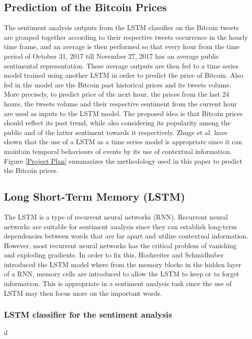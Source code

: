 \documentclass[conference]{IEEEtran}
\begin{document}
\subsection{Prediction of the Bitcoin Prices}
\par The sentiment analysis outputs from the LSTM classifier on the Bitcoin tweets are grouped together according to their respective tweets occurrence in the hourly time frame, and an average is then performed so that every hour from the time period of October 31, 2017 till November 27, 2017 has an average public sentimental representation. These average outputs are then fed to a time series model trained using another LSTM in order to predict the price of Bitcoin. Also fed in the model are the Bitcoin past historical prices and its tweets volume. More precisely, to predict price of the next hour, the prices from the last 24 hours, the tweets volume and their respective sentiment from the current hour are used as inputs to the LSTM model. The proposed idea is that Bitcoin prices should reflect its past trend, while also considering its popularity among the public and of the latter sentiment towards it respectively. Zhuge et al. \cite{LSTM Emotional} have shown that the use of a LSTM as a time series model is appropriate since it can maintain temporal behaviours of events by its use of contextual information. Figure \ref{Project Plan} summarizes the methodology used in this paper to predict the Bitcoin prices.

\subsection{Long Short-Term Memory (LSTM)}
\par The LSTM is a type of recurrent neural networks (RNN). Recurrent neural networks are suitable for sentiment analysis since they can establish long-term dependencies between words that are far apart and utilize contextual information. However, most recurrent neural networks has the critical problem of vanishing and exploding gradients. In order to fix this, Hochreiter and Schmidhuber \cite{LSTM} introduced the LSTM model where from the memory blocks in the hidden layer of a RNN, memory cells are introduced to allow the LSTM to keep or to forget information. This is appropriate in a sentiment analysis task since the use of LSTM may then focus more on the important words.

\subsubsection{LSTM classifier for the sentiment analysis}
d
\end{document}
